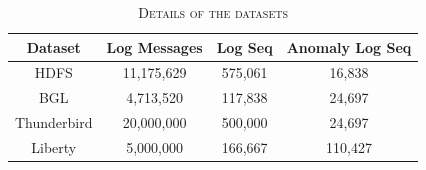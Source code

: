 \documentclass[lettersize,journal]{IEEEtran}
\begin{document}
\begin{table}[htbp]
    \centering
    \small %
    \setlength{\tabcolsep}{6pt} %
    
    \caption{\textsc{Details of the datasets}}
    \label{tab:dataset_details}
    
    \begin{tabular}{@{} c c c c @{}}
        \toprule
        \textbf{Dataset} & \textbf{Log Messages} & \textbf{Log Seq} & \textbf{Anomaly Log Seq} \\
        \midrule
        HDFS & 11,175,629 & 575,061 & 16,838 \\
        BGL & 4,713,520 & 117,838 & 24,697 \\
        Thunderbird & 20,000,000 & 500,000 & 24,697 \\
        Liberty & 5,000,000 & 166,667 & 110,427 \\ 
        \bottomrule
    \end{tabular}
\end{table}

\end{document}
